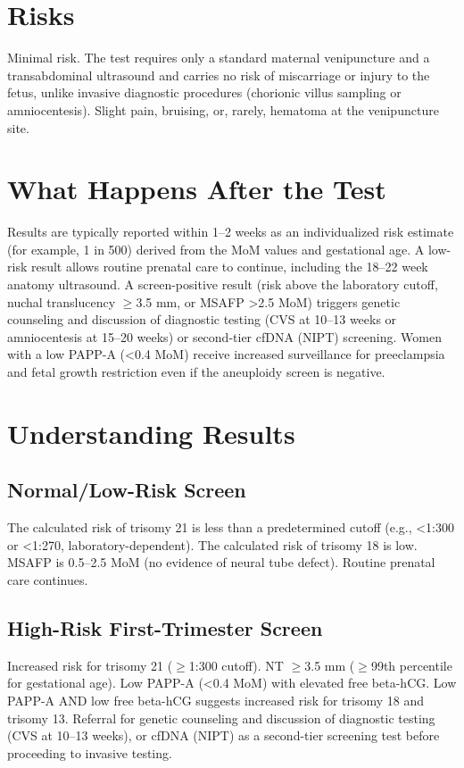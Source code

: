 \section*{Risks}
Minimal risk. The test requires only a standard maternal venipuncture and a transabdominal ultrasound and carries no risk of miscarriage or injury to the fetus, unlike invasive diagnostic procedures (chorionic villus sampling or amniocentesis). Slight pain, bruising, or, rarely, hematoma at the venipuncture site.

\section*{What Happens After the Test}
Results are typically reported within 1--2 weeks as an individualized risk estimate (for example, 1 in 500) derived from the MoM values and gestational age. A low-risk result allows routine prenatal care to continue, including the 18--22 week anatomy ultrasound. A screen-positive result (risk above the laboratory cutoff, nuchal translucency $\geq$3.5 mm, or MSAFP >2.5 MoM) triggers genetic counseling and discussion of diagnostic testing (CVS at 10--13 weeks or amniocentesis at 15--20 weeks) or second-tier cfDNA (NIPT) screening. Women with a low PAPP-A (<0.4 MoM) receive increased surveillance for preeclampsia and fetal growth restriction even if the aneuploidy screen is negative.

\section*{Understanding Results}

\subsection*{Normal/Low-Risk Screen}
The calculated risk of trisomy 21 is less than a predetermined cutoff (e.g., <1:300 or <1:270, laboratory-dependent). The calculated risk of trisomy 18 is low. MSAFP is 0.5--2.5 MoM (no evidence of neural tube defect). Routine prenatal care continues.

\subsection*{High-Risk First-Trimester Screen}
Increased risk for trisomy 21 ($\geq$1:300 cutoff). NT $\geq$3.5 mm ($\geq$99th percentile for gestational age). Low PAPP-A (<0.4 MoM) with elevated free beta-hCG. Low PAPP-A AND low free beta-hCG suggests increased risk for trisomy 18 and trisomy 13. Referral for genetic counseling and discussion of diagnostic testing (CVS at 10--13 weeks), or cfDNA (NIPT) as a second-tier screening test before proceeding to invasive testing.

